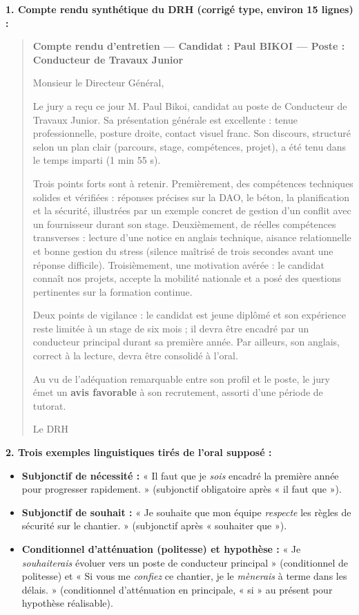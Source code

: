 \documentclass[11pt]{article}
\begin{document}
\begin{corrige}
\textbf{1. Compte rendu synthétique du DRH (corrigé type, environ 15 lignes) :}

\begin{quote}
\textbf{Compte rendu d'entretien — Candidat : Paul BIKOI — Poste : Conducteur de Travaux Junior}

Monsieur le Directeur Général,

Le jury a reçu ce jour M. Paul Bikoi, candidat au poste de Conducteur de Travaux Junior. Sa présentation générale est excellente : tenue professionnelle, posture droite, contact visuel franc. Son discours, structuré selon un plan clair (parcours, stage, compétences, projet), a été tenu dans le temps imparti (1 min 55 s).

Trois points forts sont à retenir. Premièrement, des compétences techniques solides et vérifiées : réponses précises sur la DAO, le béton, la planification et la sécurité, illustrées par un exemple concret de gestion d'un conflit avec un fournisseur durant son stage. Deuxièmement, de réelles compétences transverses : lecture d'une notice en anglais technique, aisance relationnelle et bonne gestion du stress (silence maîtrisé de trois secondes avant une réponse difficile). Troisièmement, une motivation avérée : le candidat connaît nos projets, accepte la mobilité nationale et a posé des questions pertinentes sur la formation continue.

Deux points de vigilance : le candidat est jeune diplômé et son expérience reste limitée à un stage de six mois ; il devra être encadré par un conducteur principal durant sa première année. Par ailleurs, son anglais, correct à la lecture, devra être consolidé à l'oral.

Au vu de l'adéquation remarquable entre son profil et le poste, le jury émet un \textbf{avis favorable} à son recrutement, assorti d'une période de tutorat.

Le DRH
\end{quote}

\textbf{2. Trois exemples linguistiques tirés de l'oral supposé :}
\begin{itemize}
\item \textbf{Subjonctif de nécessité :} « Il faut que je \emph{sois} encadré la première année pour progresser rapidement. » (subjonctif obligatoire après « il faut que »).
\item \textbf{Subjonctif de souhait :} « Je souhaite que mon équipe \emph{respecte} les règles de sécurité sur le chantier. » (subjonctif après « souhaiter que »).
\item \textbf{Conditionnel d'atténuation (politesse) et hypothèse :} « Je \emph{souhaiterais} évoluer vers un poste de conducteur principal » (conditionnel de politesse) et « Si vous me \emph{confiez} ce chantier, je le \emph{mènerais} à terme dans les délais. » (conditionnel d'atténuation en principale, « si » au présent pour hypothèse réalisable).
\end{itemize}


\end{corrige}
\end{document}
